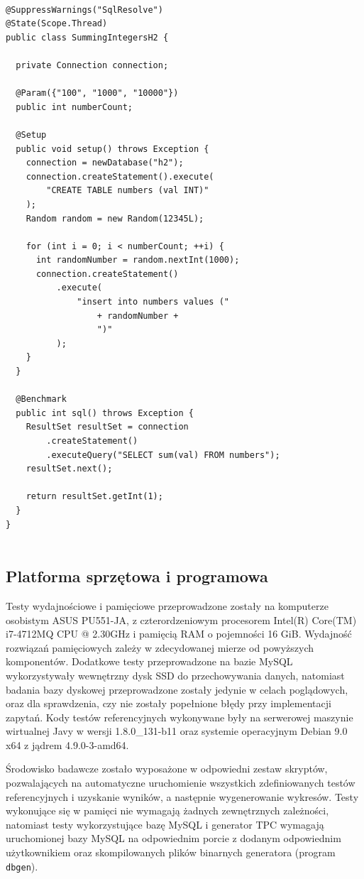\documentclass[12pt,twoside,openright]{extarticle}
\begin{document}
\begin{lstlisting}[label=testclass, caption=Przykładowa klasa JMH]

@SuppressWarnings("SqlResolve")
@State(Scope.Thread)
public class SummingIntegersH2 {
  
  private Connection connection;
  
  @Param({"100", "1000", "10000"})
  public int numberCount;
  
  @Setup
  public void setup() throws Exception {
    connection = newDatabase("h2");
    connection.createStatement().execute(
        "CREATE TABLE numbers (val INT)"
    );
    Random random = new Random(12345L);
    
    for (int i = 0; i < numberCount; ++i) {
      int randomNumber = random.nextInt(1000);
      connection.createStatement()
          .execute(
              "insert into numbers values ("
                  + randomNumber +
                  ")"
          );
    }
  }
  
  @Benchmark
  public int sql() throws Exception {
    ResultSet resultSet = connection
        .createStatement()
        .executeQuery("SELECT sum(val) FROM numbers");
    resultSet.next();
    
    return resultSet.getInt(1);
  }
}


\end{lstlisting}

\subsection{Platforma sprzętowa i programowa}

    Testy wydajnościowe i pamięciowe przeprowadzone zostały na komputerze osobistym ASUS PU551-JA, z czterordzeniowym procesorem Intel(R) Core(TM) i7-4712MQ CPU @ 2.30GHz i pamięcią RAM o pojemności 16 GiB. Wydajność rozwiązań pamięciowych zależy w zdecydowanej mierze od powyższych komponentów. Dodatkowe testy przeprowadzone na bazie MySQL wykorzystywały wewnętrzny dysk SSD  do przechowywania danych, natomiast badania bazy dyskowej przeprowadzone zostały jedynie w celach poglądowych, oraz dla sprawdzenia, czy nie zostały popełnione błędy przy implementacji zapytań. Kody testów referencyjnych wykonywane były na serwerowej maszynie wirtualnej Javy w wersji 1.8.0\_131-b11 oraz systemie operacyjnym Debian 9.0 x64 z jądrem 4.9.0-3-amd64.

    Środowisko badawcze zostało wyposażone w odpowiedni zestaw skryptów, pozwalających na automatyczne uruchomienie wszystkich zdefiniowanych testów referencyjnych i uzyskanie wyników, a następnie wygenerowanie wykresów. Testy wykonujące się w pamięci nie wymagają żadnych zewnętrznych zależności, natomiast testy wykorzystujące bazę MySQL i generator TPC wymagają uruchomionej bazy MySQL na odpowiednim porcie z dodanym odpowiednim użytkownikiem oraz skompilowanych plików binarnych generatora (program \texttt{dbgen}).
\end{document}
